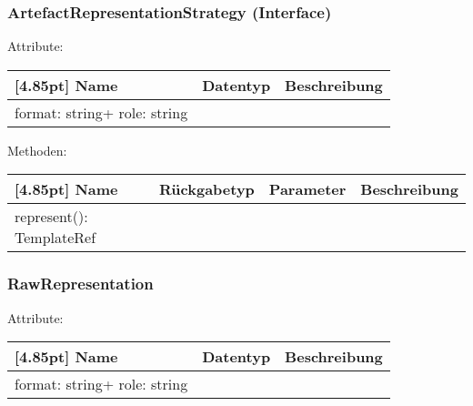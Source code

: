         	\subsubsection{ArtefactRepresentationStrategy (Interface)}
        	
        	    Attribute:
                \begin{center}
                	\renewcommand{\arraystretch}{1.5}
                    \setlength\tabcolsep{5pt}
                	\begin{tabularx}{\textwidth}{|l|l|X|}
                		\hline
                        \rowcolor[gray]{0.75}[4.85pt]            		
                        Name & Datentyp & Beschreibung \\ \hline
                        format: string+ role: string
                        & &  \\ \hline
                	\end{tabularx}
                \end{center}
                
                Methoden:
        		\begin{center}
                \setlength\tabcolsep{5pt}
                	\renewcommand{\arraystretch}{1.5}
                    	\begin{tabularx}{\textwidth}{|l|l|l|X|}
                    	\hline
                    	\rowcolor[gray]{0.75}[4.85pt]
                		Name & Rückgabetyp & Parameter & Beschreibung \\ \hline
                		represent(): TemplateRef
                        & & &  \\ \hline
                        \end{tabularx}
        		\end{center}
        	
        	\subsubsection{RawRepresentation}
        	
        	    Attribute:
                \begin{center}
                	\renewcommand{\arraystretch}{1.5}
                    \setlength\tabcolsep{5pt}
                	\begin{tabularx}{\textwidth}{|l|l|X|}
                		\hline
                        \rowcolor[gray]{0.75}[4.85pt]            		
                        Name & Datentyp & Beschreibung \\ \hline
                        format: string+ role: string
                        & &  \\ \hline
                	\end{tabularx}
                \end{center}
                
